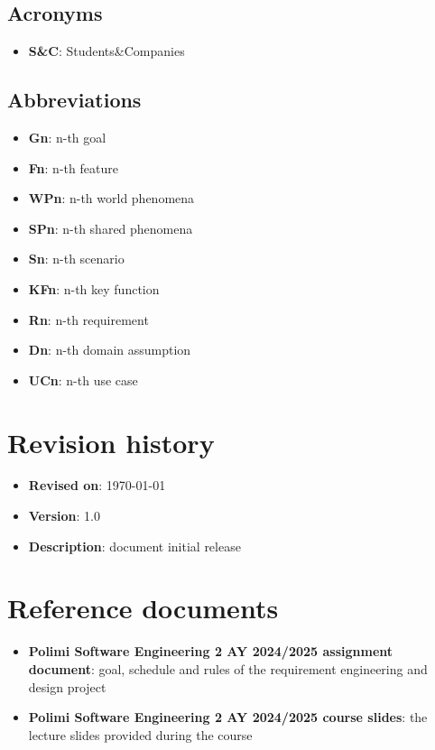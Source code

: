 \subsection{Acronyms}

\begin{itemize}
    \item \textbf{S\&C}: Students\&Companies
\end{itemize}

\subsection{Abbreviations}

\begin{itemize}
    \item \textbf{Gn}: n-th goal
    \item \textbf{Fn}: n-th feature
    \item \textbf{WPn}: n-th world phenomena
    \item \textbf{SPn}: n-th shared phenomena
    \item \textbf{Sn}: n-th scenario
    \item \textbf{KFn}: n-th key function
    \item \textbf{Rn}: n-th requirement
    \item \textbf{Dn}: n-th domain assumption
    \item \textbf{UCn}: n-th use case
\end{itemize}

\section{Revision history}

\begin{itemize}
    \item \textbf{Revised on}: \today
    \item \textbf{Version}: 1.0
    \item \textbf{Description}: document initial release
\end{itemize}

\section{Reference documents}

\begin{itemize}
    \item \textbf{Polimi Software Engineering 2 AY 2024/2025 assignment document}: goal, schedule and rules of the requirement engineering and design project
    \item \textbf{Polimi Software Engineering 2 AY 2024/2025 course slides}: the lecture slides provided during the course
\end{itemize}


